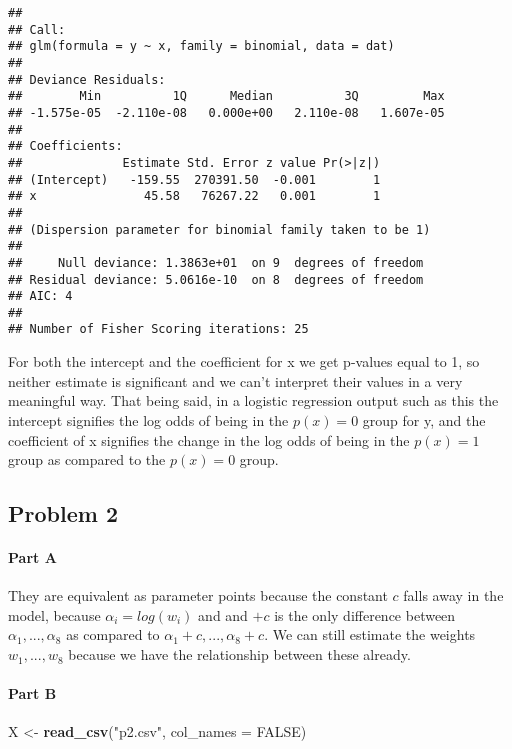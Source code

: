 \documentclass[
]{article}
\newenvironment{Shaded}{\begin{snugshade}}{\end{snugshade}}
\newcommand{\DataTypeTok}[1]{\textcolor[rgb]{0.13,0.29,0.53}{#1}}
\newcommand{\KeywordTok}[1]{\textcolor[rgb]{0.13,0.29,0.53}{\textbf{#1}}}
\newcommand{\NormalTok}[1]{#1}
\newcommand{\OtherTok}[1]{\textcolor[rgb]{0.56,0.35,0.01}{#1}}
\newcommand{\StringTok}[1]{\textcolor[rgb]{0.31,0.60,0.02}{#1}}
\begin{document}
\begin{verbatim}
## 
## Call:
## glm(formula = y ~ x, family = binomial, data = dat)
## 
## Deviance Residuals: 
##        Min          1Q      Median          3Q         Max  
## -1.575e-05  -2.110e-08   0.000e+00   2.110e-08   1.607e-05  
## 
## Coefficients:
##              Estimate Std. Error z value Pr(>|z|)
## (Intercept)   -159.55  270391.50  -0.001        1
## x               45.58   76267.22   0.001        1
## 
## (Dispersion parameter for binomial family taken to be 1)
## 
##     Null deviance: 1.3863e+01  on 9  degrees of freedom
## Residual deviance: 5.0616e-10  on 8  degrees of freedom
## AIC: 4
## 
## Number of Fisher Scoring iterations: 25
\end{verbatim}

For both the intercept and the coefficient for x we get p-values equal
to 1, so neither estimate is significant and we can't interpret their
values in a very meaningful way. That being said, in a logistic
regression output such as this the intercept signifies the log odds of
being in the \(p(x)=0\) group for y, and the coefficient of x signifies
the change in the log odds of being in the \(p(x)=1\) group as compared
to the \(p(x)=0\) group.

\hypertarget{problem-2}{%
\subsection{Problem 2}\label{problem-2}}

\hypertarget{part-a}{%
\paragraph{Part A}\label{part-a}}

They are equivalent as parameter points because the constant \(c\) falls
away in the model, because \(\alpha_i=log(w_i)\) and and \(+c\) is the
only difference between \(\alpha_1, ..., \alpha_8\) as compared to
\(\alpha_1+c, ..., \alpha_8+c\). We can still estimate the weights
\(w_1,...,w_8\) because we have the relationship between these already.

\hypertarget{part-b}{%
\paragraph{Part B}\label{part-b}}

\begin{Shaded}
\begin{Highlighting}[]
\NormalTok{X <-}\StringTok{ }\KeywordTok{read_csv}\NormalTok{(}\StringTok{"p2.csv"}\NormalTok{, }\DataTypeTok{col_names =} \OtherTok{FALSE}\NormalTok{)}
\end{Highlighting}
\end{Shaded}
\end{document}
